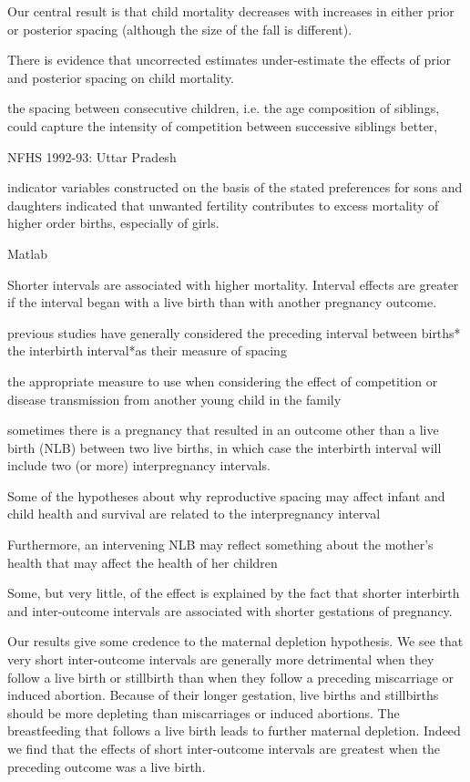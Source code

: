 Our central result is that child mortality decreases with increases in
either prior or posterior spacing (although the size of the fall is
different).

There is evidence that uncorrected estimates under-estimate the effects
of prior and posterior spacing on child mortality.

the spacing between consecutive children, i.e. the age composition of
siblings, could capture the intensity of competition between successive
siblings better,

\citep{Bhargava2003}

NFHS 1992-93: Uttar Pradesh

indicator variables constructed on the basis of the stated preferences for sons and daughters indicated that unwanted fertility contributes to excess mortality of higher order births, especially of girls.

\citep{Davanzo2008}

Matlab

Shorter intervals are associated with higher mortality. Interval effects are greater if the
interval began with a live birth than with another pregnancy outcome.

previous studies have generally considered the preceding interval between births* the interbirth interval*as their measure of spacing

the appropriate measure to use when considering the effect of competition or disease transmission from another young child in the family

sometimes there is a pregnancy that resulted in an outcome other than a live birth (NLB) between two live births, in which case the interbirth interval will include two (or more) interpregnancy intervals.

Some of the hypotheses about why reproductive spacing may affect infant and child health and survival are related to the interpregnancy interval

Furthermore, an intervening NLB may reflect something about the mother’s health that may affect the health of her children

Some, but very little, of the effect is explained by the fact that shorter interbirth and inter-outcome intervals are associated with shorter gestations of pregnancy.

Our results give some credence to the maternal depletion hypothesis.
We see that very short inter-outcome intervals are generally more detrimental when they follow a live birth or stillbirth than when they follow a preceding miscarriage or induced abortion. Because of their longer gestation, live births and stillbirths should be more depleting than miscarriages or induced abortions.
The breastfeeding that follows a live birth leads to further maternal depletion. Indeed we find that the effects of short inter-outcome intervals are greatest when the preceding outcome was a live birth.

